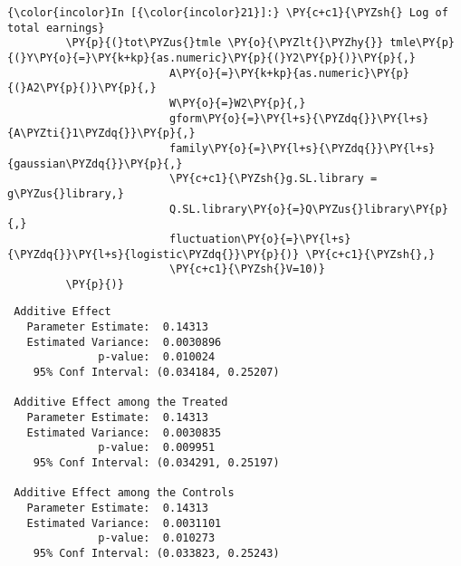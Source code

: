    \begin{Verbatim}[commandchars=\\\{\}]
{\color{incolor}In [{\color{incolor}21}]:} \PY{c+c1}{\PYZsh{} Log of total earnings}
         \PY{p}{(}tot\PYZus{}tmle \PY{o}{\PYZlt{}\PYZhy{}} tmle\PY{p}{(}Y\PY{o}{=}\PY{k+kp}{as.numeric}\PY{p}{(}Y2\PY{p}{)}\PY{p}{,}
                         A\PY{o}{=}\PY{k+kp}{as.numeric}\PY{p}{(}A2\PY{p}{)}\PY{p}{,}
                         W\PY{o}{=}W2\PY{p}{,}
                         gform\PY{o}{=}\PY{l+s}{\PYZdq{}}\PY{l+s}{A\PYZti{}1\PYZdq{}}\PY{p}{,}
                         family\PY{o}{=}\PY{l+s}{\PYZdq{}}\PY{l+s}{gaussian\PYZdq{}}\PY{p}{,}
                         \PY{c+c1}{\PYZsh{}g.SL.library = g\PYZus{}library,}
                         Q.SL.library\PY{o}{=}Q\PYZus{}library\PY{p}{,}
                         fluctuation\PY{o}{=}\PY{l+s}{\PYZdq{}}\PY{l+s}{logistic\PYZdq{}}\PY{p}{)} \PY{c+c1}{\PYZsh{},}
                         \PY{c+c1}{\PYZsh{}V=10)}
         \PY{p}{)}
\end{Verbatim}


    
    \begin{verbatim}
 Additive Effect
   Parameter Estimate:  0.14313
   Estimated Variance:  0.0030896
              p-value:  0.010024
    95% Conf Interval: (0.034184, 0.25207) 

 Additive Effect among the Treated
   Parameter Estimate:  0.14313
   Estimated Variance:  0.0030835
              p-value:  0.009951
    95% Conf Interval: (0.034291, 0.25197) 

 Additive Effect among the Controls
   Parameter Estimate:  0.14313
   Estimated Variance:  0.0031101
              p-value:  0.010273
    95% Conf Interval: (0.033823, 0.25243) 
    \end{verbatim}

 
